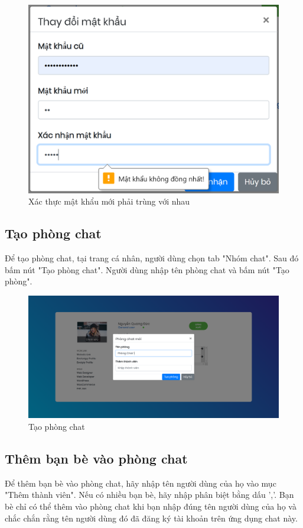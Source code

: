 \documentclass[a4paper]{article}
\begin{document}
	\begin{figure}[H]
		\centering
		\includegraphics[scale=0.8]{password_not_match.png}
		\caption{Xác thực mật khẩu mới phải trùng với nhau}
		\label{F:password_not_match}
	\end{figure}
	
	\subsection{Tạo phòng chat}
	Để tạo phòng chat, tại trang cá nhân, người dùng chọn tab "Nhóm chat". Sau đó bấm nút "Tạo phòng chat".\linebreak
	Người dùng nhập tên phòng chat và bấm nút "Tạo phòng".
	
	\begin{figure}[H]
		\centering
		\includegraphics[scale=0.36]{create_room.png}
		\caption{Tạo phòng chat}
		\label{F:create_room}
	\end{figure}
	
	\subsection{Thêm bạn bè vào phòng chat}
	Để thêm bạn bè vào phòng chat, hãy nhập tên người dùng của họ vào mục "Thêm thành viên". Nếu có nhiều bạn bè, hãy nhập phân biệt bằng dấu ','.\linebreak
	Bạn bè chỉ có thể thêm vào phòng chat khi bạn nhập đúng tên người dùng của họ và chắc chắn rằng tên người dùng đó đã đăng ký tài khoản trên ứng dụng chat này.
	
\end{document}
